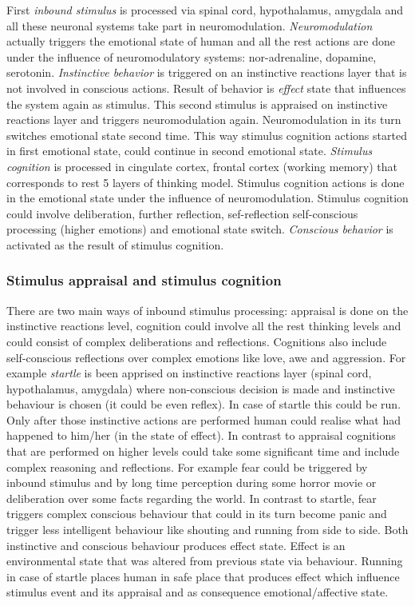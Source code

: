 First \emph{inbound stimulus} is processed via spinal cord, hypothalamus, amygdala and all these neuronal systems take part in neuromodulation. 
\emph{Neuromodulation} actually triggers the emotional state of human and all the rest actions are done under the influence of neuromodulatory systems: nor-adrenaline, dopamine, serotonin. 
\emph{Instinctive behavior} is triggered on an instinctive reactions layer that is not involved in conscious actions. 
Result of behavior is \emph{effect} state that influences the system again as stimulus. This second stimulus is appraised on instinctive reactions layer and triggers neuromodulation again. Neuromodulation in its turn switches emotional state second time. This way stimulus cognition actions started in first emotional state, could continue in second emotional state. 
\emph{Stimulus cognition} is processed in cingulate cortex, frontal cortex (working memory) that corresponds to rest 5 layers of thinking model. Stimulus cognition actions is done in the emotional state under the influence of neuromodulation. Stimulus cognition could involve deliberation, further reflection, sef-reflection self-conscious processing (higher emotions) and  emotional state switch.
\emph{Conscious behavior} is activated as the result of stimulus cognition.

\subsubsection{Stimulus appraisal and stimulus cognition}

There are two main ways of inbound stimulus processing: appraisal is done on the instinctive reactions level, cognition could involve all the rest thinking levels and could consist of complex deliberations and reflections.
Cognitions also include self-conscious reflections over complex emotions like love, awe and aggression. For example \emph{startle} is been apprised on instinctive reactions layer (spinal cord, hypothalamus, amygdala) where non-conscious decision is made and instinctive behaviour is chosen (it could be even reflex). In case of startle this could be run. Only after those instinctive actions are performed human could realise what had happened to him/her (in the state of effect). In contrast to appraisal cognitions that are performed on higher levels could take some significant time and include complex reasoning and reflections. For example fear could be triggered by inbound stimulus and by long time perception during some horror movie or deliberation over some facts regarding the world. In contrast to startle, fear triggers complex conscious behaviour that could in its turn become panic and trigger less intelligent behaviour like shouting and running from side to side. Both instinctive and conscious behaviour produces effect state. Effect is an environmental state that was altered from previous state via behaviour. Running in case of startle places human in safe place that produces effect which influence stimulus event and its appraisal and as consequence emotional/affective state.

